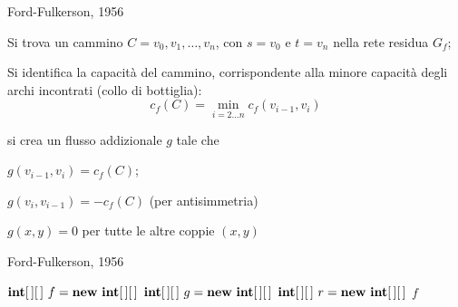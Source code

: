 \begin{frame}{Ford-Fulkerson, 1956}

\vspace{-9pt}
\begin{overprint}
\BIL
\item Si trova un cammino $C=v_0,v_1,\ldots, v_n$, con $s=v_0$ e $t=v_n$ 
  nella rete residua $G_f$; 
\item Si identifica la \alert{capacità del cammino}, corrispondente
  alla minore capacità degli archi incontrati (collo di bottiglia):
  \smallskip
  \[
    c_f(C) = \min_{i=2 \ldots n} c_f(v_{i-1},v_i)
  \]
\EIL
{}
\BIL
\item si crea un flusso addizionale $g$ tale che 
  \BI
  \item $g(v_{i-1}, v_i) = c_f(C)$;
  \item $g(v_i,v_{i-1}) = -c_f(C)$ (per antisimmetria)
  \item $g(x,y)=0$ per tutte le altre coppie $(x,y)$
  \EI
\EIL
\end{overprint}

\medskip
\begin{overprint}
\begin{center}
\end{center}
\begin{center}
\end{center}
\end{overprint}



\end{frame}

\begin{frame}{Ford-Fulkerson, 1956}

\vspace{-9pt}
\begin{Procedure}
\caption[A]{$\INTARRAY[\,]$ \Flusso(\Graph $G$, \Node $s$, \Node $t$, $\INTARRAY[\,]\ c$)}
$\INTARRAY[\,]\ f = \NEW\ \INTARRAY[\,]$
$\INTARRAY[\,]\ g = \NEW\ \INTARRAY[\,]$
$\INTARRAY[\,]\ r = \NEW\ \INTARRAY[\,]$
\BlankLine
{}
\Return $f$
\end{Procedure}

\end{frame}

